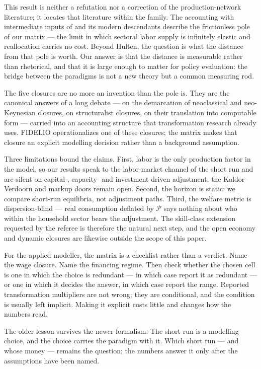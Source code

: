 This result is neither a refutation nor a correction of the
production-network literature; it locates that literature within the family.
The accounting with intermediate inputs of \citet{Hulten.1978} and its
modern descendants \citep{Baqaee.2021,Acemoglu.2012} describe the
frictionless pole of our matrix --- the limit in which sectoral labor supply
is infinitely elastic and reallocation carries no cost. Beyond Hulten, the
question is what the distance from that pole is worth. Our answer is that
the distance is measurable rather than rhetorical, and that it is large
enough to matter for policy evaluation: the bridge between the paradigms is
not a new theory but a common measuring rod.

The five closures are no more an invention than the pole is. They are the
canonical answers of a long debate --- \citet{Sen1963} on the demarcation of
neoclassical and neo-Keynesian closures, \citet{Taylor1990} on structuralist
closures, \citet{Rose.1995} on their translation into computable form ---
carried into an accounting structure that transformation research already
uses. FIDELIO \citep{Rocchi.2025} operationalizes one of these closures; the
matrix makes that closure an explicit modelling decision rather than a
background assumption.

Three limitations bound the claims. First, labor is the only production
factor in the model, so our results speak to the labor-market channel of the
short run and are silent on capital-, capacity- and investment-driven
adjustment; the Kaldor--Verdoorn and markup doors remain open. Second, the
horizon is static: we compare short-run equilibria, not adjustment paths.
Third, the welfare metric is dispersion-blind --- real consumption deflated
by $\mathcal{P}$ says nothing about who within the household sector bears
the adjustment. The skill-class extension requested by the referee is
therefore the natural next step, and the open economy and dynamic closures
are likewise outside the scope of this paper.

For the applied modeller, the matrix is a checklist rather than a verdict.
Name the wage closure. Name the financing regime. Then check whether the
chosen cell is one in which the choice is redundant --- in which case report
it as redundant --- or one in which it decides the answer, in which case
report the range. Reported transformation multipliers are not wrong; they
are conditional, and the condition is usually left implicit. Making it
explicit costs little and changes how the numbers read.

The older lesson survives the newer formalism. The short run is a modelling
choice, and the choice carries the paradigm with it. Which short run --- and
whose money --- remains the question; the numbers answer it only after the
assumptions have been named.
